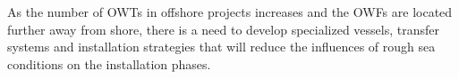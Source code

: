 As the number of OWTs in offshore projects increases and the OWFs are located further away from shore, there is a need to develop specialized vessels, transfer systems and installation strategies that will reduce the influences of rough sea conditions on the installation phases.



